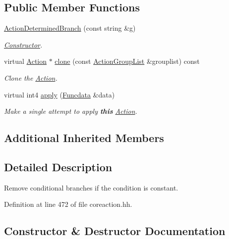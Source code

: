 \subsection*{Public Member Functions}
\begin{DoxyCompactItemize}
\item 
\mbox{\hyperlink{class_action_determined_branch_a019f678e1dc3000e04810633d39b61f8}{Action\+Determined\+Branch}} (const string \&g)
\begin{DoxyCompactList}\small\item\em \mbox{\hyperlink{class_constructor}{Constructor}}. \end{DoxyCompactList}\item 
virtual \mbox{\hyperlink{class_action}{Action}} $\ast$ \mbox{\hyperlink{class_action_determined_branch_a41b8b77cfb5f57c0639009ead3c25ee9}{clone}} (const \mbox{\hyperlink{class_action_group_list}{Action\+Group\+List}} \&grouplist) const
\begin{DoxyCompactList}\small\item\em Clone the \mbox{\hyperlink{class_action}{Action}}. \end{DoxyCompactList}\item 
virtual int4 \mbox{\hyperlink{class_action_determined_branch_ade1a39edabc809aa136ef4f109d46560}{apply}} (\mbox{\hyperlink{class_funcdata}{Funcdata}} \&data)
\begin{DoxyCompactList}\small\item\em Make a single attempt to apply {\bfseries{this}} \mbox{\hyperlink{class_action}{Action}}. \end{DoxyCompactList}\end{DoxyCompactItemize}
\subsection*{Additional Inherited Members}


\subsection{Detailed Description}
Remove conditional branches if the condition is constant. 

Definition at line 472 of file coreaction.\+hh.



\subsection{Constructor \& Destructor Documentation}
\mbox{\label{class_action_determined_branch_a019f678e1dc3000e04810633d39b61f8}} 
